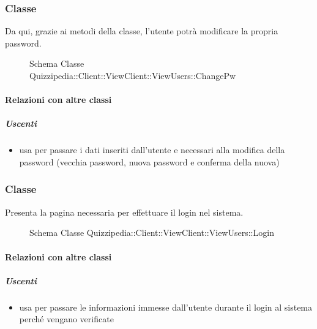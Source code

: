 \subsubsection{Classe }
Da qui, grazie ai metodi della classe, l'utente potrà modificare la propria password.
\begin{figure}[H]
\centering
\noindent{}
\caption[Schema Classe ChangePw]{Schema Classe Quizzipedia::Client::ViewClient::ViewUsers::ChangePw}
\end{figure}
\paragraph{Relazioni con altre classi}
\subparagraph{Uscenti}
\begin{itemize}
\item usa  per passare i dati inseriti dall'utente e necessari alla modifica della password (vecchia password, nuova password e conferma della nuova)
\end{itemize}
\subsubsection{Classe }
Presenta la pagina necessaria per effettuare il login nel sistema.
\begin{figure}[H]
\centering
\noindent{}
\caption[Schema Classe Login]{Schema Classe Quizzipedia::Client::ViewClient::ViewUsers::Login}
\end{figure}
\paragraph{Relazioni con altre classi}
\subparagraph{Uscenti}
\begin{itemize}
\item usa  per passare le informazioni immesse dall'utente durante il login al sistema perché vengano verificate
\end{itemize}
